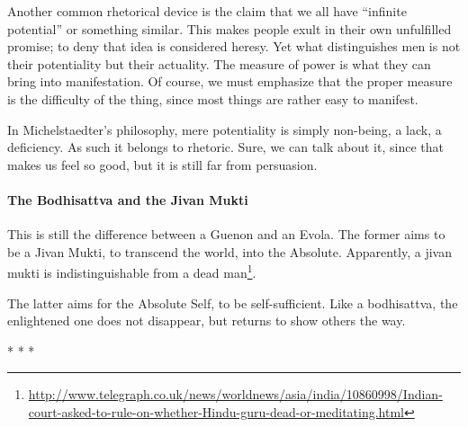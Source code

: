 Another common rhetorical device is the claim that we all have ``infinite potential'' or something similar. This makes people exult in their own unfulfilled promise; to deny that idea is considered heresy. Yet what distinguishes men is not their potentiality but their actuality. The measure of power is what they can bring into manifestation. Of course, we must emphasize that the proper measure is the difficulty of the thing, since most things are rather easy to manifest.

In Michelstaedter's philosophy, mere potentiality is simply non-being, a lack, a deficiency. As such it belongs to rhetoric. Sure, we can talk about it, since that makes us feel so good, but it is still far from persuasion.

\paragraph{The Bodhisattva and the Jivan Mukti}


This is still the difference between a Guenon and an Evola. The former aims to be a Jivan Mukti, to transcend the world, into the Absolute. Apparently, a jivan mukti is indistinguishable from a dead man\footnote{\url{http://www.telegraph.co.uk/news/worldnews/asia/india/10860998/Indian-court-asked-to-rule-on-whether-Hindu-guru-dead-or-meditating.html}}.

The latter aims for the Absolute Self, to be self-sufficient. Like a bodhisattva, the enlightened one does not disappear, but returns to show others the way.



\begin{center}* * *\end{center}

